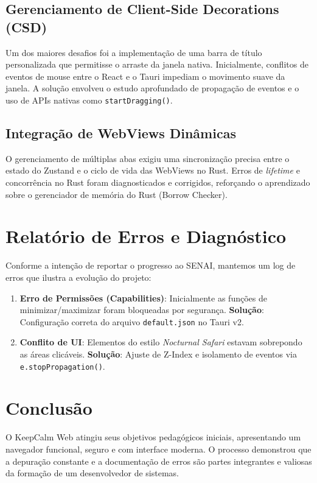 \documentclass[12pt,a4paper]{article}
\begin{document}
\subsection{Gerenciamento de Client-Side Decorations (CSD)}
Um dos maiores desafios foi a implementação de uma barra de título personalizada que permitisse o arraste da janela nativa. Inicialmente, conflitos de eventos de mouse entre o React e o Tauri impediam o movimento suave da janela. A solução envolveu o estudo aprofundado de propagação de eventos e o uso de APIs nativas como \texttt{startDragging()}.

\subsection{Integração de WebViews Dinâmicas}
O gerenciamento de múltiplas abas exigiu uma sincronização precisa entre o estado do Zustand e o ciclo de vida das WebViews no Rust. Erros de \textit{lifetime} e concorrência no Rust foram diagnosticados e corrigidos, reforçando o aprendizado sobre o gerenciador de memória do Rust (Borrow Checker).

\section{Relatório de Erros e Diagnóstico}
Conforme a intenção de reportar o progresso ao SENAI, mantemos um log de erros que ilustra a evolução do projeto:

\begin{enumerate}
    \item \textbf{Erro de Permissões (Capabilities)}: Inicialmente as funções de minimizar/maximizar foram bloqueadas por segurança. \textbf{Solução}: Configuração correta do arquivo \texttt{default.json} no Tauri v2.
    \item \textbf{Conflito de UI}: Elementos do estilo \textit{Nocturnal Safari} estavam sobrepondo as áreas clicáveis. \textbf{Solução}: Ajuste de Z-Index e isolamento de eventos via \texttt{e.stopPropagation()}.
\end{enumerate}

\section{Conclusão}
O KeepCalm Web atingiu seus objetivos pedagógicos iniciais, apresentando um navegador funcional, seguro e com interface moderna. O processo demonstrou que a depuração constante e a documentação de erros são partes integrantes e valiosas da formação de um desenvolvedor de sistemas.
\end{document}
